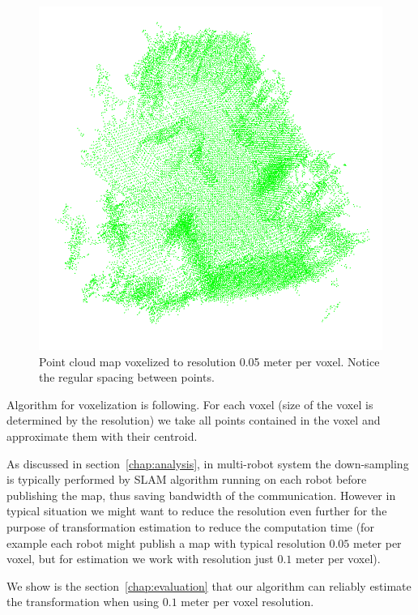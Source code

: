 \begin{figure}
    \centering
    \includegraphics[width=\textwidth]{../img/v1-downsampled.png}
    \caption[Voxelized point cloud map]{Point cloud map voxelized to resolution 0.05 meter per voxel. Notice the regular spacing between points.}
    \label{fig:v1-downsampled}
\end{figure}

Algorithm for voxelization is following. For each voxel (size of the voxel is determined by the resolution) we take all points contained in the voxel and approximate them with their centroid.

As discussed in section~\ref{chap:analysis}, in multi-robot system the down-sampling is typically performed by \gls{SLAM} algorithm running on each robot before publishing the map, thus saving bandwidth of the communication. However in typical situation we might want to reduce the resolution even further for the purpose of transformation estimation to reduce the computation time (for example each robot might publish a map with typical resolution $0.05$ meter per voxel, but for estimation we work with resolution just $0.1$ meter per voxel).

We show is the section~\ref{chap:evaluation} that our algorithm can reliably estimate the transformation when using $0.1$ meter per voxel resolution.

